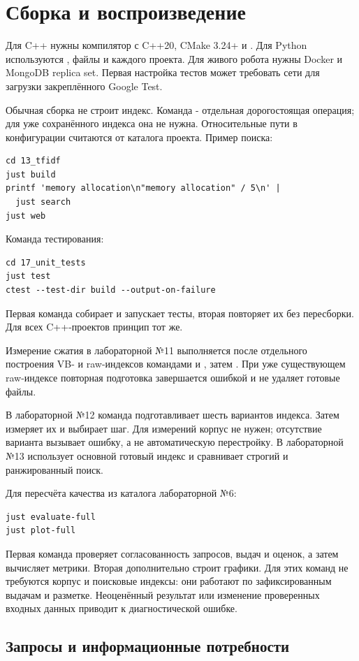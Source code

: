 \clearpage
\section*{Сборка и воспроизведение}
Для C++ нужны компилятор с C++20, CMake 3.24+ и .
Для Python используются , файлы 
и  каждого проекта. Для живого робота нужны Docker
и MongoDB replica set. Первая настройка тестов может требовать
сети для загрузки закреплённого Google Test.

Обычная сборка  не строит индекс.
Команда  - отдельная дорогостоящая
операция; для уже сохранённого индекса она не нужна.
Относительные пути в конфигурации считаются от каталога проекта.
Пример поиска:
\begin{lstlisting}
cd 13_tfidf
just build
printf 'memory allocation\n"memory allocation" / 5\n' |
  just search
just web
\end{lstlisting}
Команда тестирования:
\begin{lstlisting}
cd 17_unit_tests
just test
ctest --test-dir build --output-on-failure
\end{lstlisting}
Первая команда собирает и запускает тесты, вторая повторяет их
без пересборки. Для всех C++-проектов принцип тот же.

Измерение сжатия в лабораторной №11 выполняется после отдельного
построения VB- и raw-индексов командами 
и , затем .
При уже существующем raw-индексе повторная подготовка завершается
ошибкой и не удаляет готовые файлы.

В лабораторной №12 команда  подготавливает
шесть вариантов индекса. Затем  измеряет их и
выбирает шаг. Для измерений корпус не нужен; отсутствие варианта
вызывает ошибку, а не автоматическую перестройку.
В лабораторной №13  использует основной готовый
индекс и сравнивает строгий и ранжированный поиск.

Для пересчёта качества из каталога лабораторной №6:
\begin{lstlisting}
just evaluate-full
just plot-full
\end{lstlisting}
Первая команда проверяет согласованность запросов, выдач и оценок,
а затем вычисляет метрики. Вторая дополнительно строит графики.
Для этих команд не требуются корпус и поисковые индексы:
они работают по зафиксированным выдачам и разметке.
Неоценённый результат или изменение проверенных входных данных
приводит к диагностической ошибке.

\clearpage
\subsection*{Запросы и информационные потребности}


